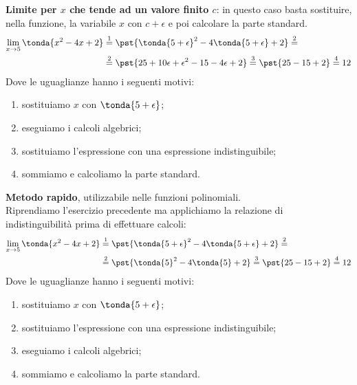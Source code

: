 \begin{esempio}
\textbf{Limite per \(x\) che tende ad un valore finito \(c\)}:
in questo caso basta sostituire, nella funzione, la variabile \(x\) con 
\(c+\epsilon\) e poi calcolare la parte standard.
\begin{align*}
\lim_{x \rightarrow 5} \tonda{x^2-4x+2} & \stackrel{1}{=} 
  \pst{\tonda{5+\epsilon}^2-4\tonda{5+\epsilon}+2} \stackrel{2}{=}\\  
  & \stackrel{2}{=} \pst{25 + 10 \epsilon + \epsilon^2 - 15 - 4\epsilon + 2} 
  \stackrel{3}{=} \pst{25 - 15 + 2} \stackrel{4}{=} 12
\end{align*}
Dove le uguaglianze hanno i seguenti motivi:
\begin{enumerate} [nosep]
 \item sostituiamo \(x\) con \(\tonda{5+\epsilon}\);
 \item eseguiamo i calcoli algebrici;
 \item sostituiamo l'espressione con una espressione indistinguibile;
 \item sommiamo e calcoliamo la parte standard.
\end{enumerate}
\end{esempio}

\begin{esempio}
\textbf{Metodo rapido}, utilizzabile nelle funzioni polinomiali. \\
Riprendiamo l'esercizio precedente ma applichiamo la relazione di 
indistinguibilità prima di effettuare calcoli:
\begin{align*}
\lim_{x \rightarrow 5} \tonda{x^2-4x+2} & \stackrel{1}{=} 
  \pst{\tonda{5+\epsilon}^2-4\tonda{5+\epsilon}+2} \stackrel{2}{=}\\ 
  & \stackrel{2}{=}\pst{\tonda{5}^2-4\tonda{5}+2} \stackrel{3}{=}
  \pst{25 - 15 + 2} \stackrel{4}{=} 12
\end{align*}
Dove le uguaglianze hanno i seguenti motivi:
\begin{enumerate} [nosep]
 \item sostituiamo \(x\) con \(\tonda{5+\epsilon}\);
 \item sostituiamo l'espressione con una espressione indistinguibile;
 \item eseguiamo i calcoli algebrici;
 \item sommiamo e calcoliamo la parte standard.
\end{enumerate}
\end{esempio}

